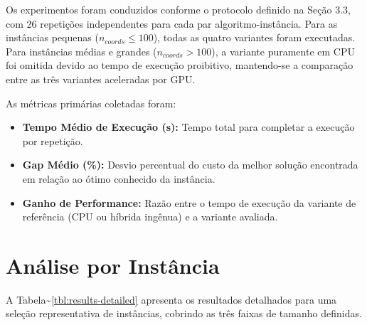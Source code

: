 Os experimentos foram conduzidos conforme o protocolo definido na Seção 3.3, com 26 repetições independentes para cada par algoritmo-instância.
Para as instâncias pequenas (\(n_{coords} \le 100\)), todas as quatro variantes foram executadas.
Para instâncias médias e grandes (\(n_{coords} > 100\)), a variante puramente em CPU foi omitida devido ao tempo de execução proibitivo, mantendo-se a comparação entre as três variantes aceleradas por GPU.

As métricas primárias coletadas foram:

\begin{itemize}
  \tightlist
  \item
        \textbf{Tempo Médio de Execução (s):} Tempo total para completar a execução por repetição.
  \item
        \textbf{Gap Médio (\%):} Desvio percentual do custo da melhor solução encontrada em relação ao ótimo conhecido da instância.
  \item
        \textbf{Ganho de Performance:} Razão entre o tempo de execução da variante de referência (CPU ou híbrida ingênua) e a variante avaliada.
\end{itemize}

\section{Análise por Instância}\label{sec-42-analise-por-instancia}

A Tabela\textasciitilde{}\ref{tbl:results-detailed} apresenta os resultados detalhados para uma seleção representativa de instâncias, cobrindo as três faixas de tamanho definidas.

